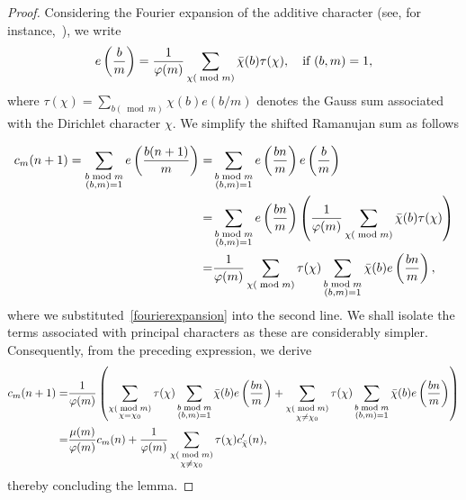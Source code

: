 \documentclass[12pt, oneside,reqno]{amsart}
\numberwithin{equation}{section}
\begin{document}
\begin{proof} 
Considering the Fourier expansion of the additive character (see, for instance,~\cite[\S3.4]{iwanieckowlaski}), we write
\begin{align}\label{fourierexpansion} 
e\left(\frac{b}{m}\right)
=\frac{1}{\varphi(m)}\sum_{\substack{\chi(\bmod{m})}}\Bar{\chi}(b)\tau(\chi), \quad \text{if $(b, m) = 1$}, 
\end{align}
where $\tau(\chi)=\sum_{b(\bmod{m})}\chi(b)e(b/m)$ denotes the Gauss sum associated with the Dirichlet character $\chi$. We simplify the shifted Ramanujan sum as follows

\begin{align}\label{generalizedramanujansum}
c_m(n+1)
=\sum_{\substack{b\bmod{m}\\(b,m)=1}}e\left(\frac{b(n+1)}{m}\right)
=&\sum_{\substack{b\bmod{m}\\(b,m)=1}}e\left(\frac{bn}{m}\right)e\left(\frac{b}{m}\right)\nonumber\\
=&\sum_{\substack{b\bmod{m}\\(b,m)=1}}e\left(\frac{bn}{m}\right)\left(\frac{1}{\varphi(m)}\sum_{\chi(\bmod{m})}\Bar{\chi}(b)\tau(\chi)\right)\nonumber\\
=&\frac{1}{\varphi(m)}\sum_{\chi(\bmod{m})}\tau(\chi)\sum_{\substack{b\bmod{m}\\(b,m)=1}}\Bar{\chi}(b) e\left(\frac{bn}{m}\right),
\end{align}
where we substituted~\eqref{fourierexpansion} into the second line. We shall isolate the terms associated with principal characters as these are considerably simpler. Consequently, from the preceding expression, we derive
\begin{align*}
c_m(n+1)
=&\frac{1}{\varphi(m)}\left(\sum_{\substack{\chi(\bmod{m})\\ \chi=\chi_0}}\tau(\chi)\sum_{\substack{b\bmod{m}\\(b,m)=1}}\Bar{\chi}(b) e\left(\frac{bn}{m}\right)+\sum_{\substack{\chi(\bmod{m})\\ \chi\ne\chi_0}}\tau(\chi)\sum_{\substack{b\bmod{m}\\(b,m)=1}}\Bar{\chi}(b) e\left(\frac{bn}{m}\right)\right)\nonumber\\
=&\frac{\mu(m)}{\varphi(m)}c_m(n)+\frac{1}{\varphi(m)}\sum_{\substack{\chi(\bmod{m})\\ \chi\ne\chi_0}}\tau(\chi)c'_{\bar{\chi}}(n),
\end{align*}
thereby concluding the lemma.
\end{proof}
\end{document}
